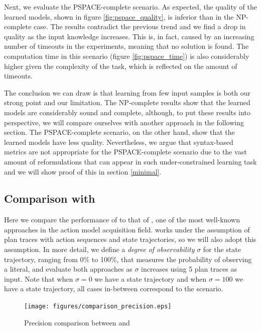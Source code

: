Next, we evaluate the PSPACE-complete scenario. As expected, the quality of the learned models, shown in figure \ref{fig:pspace_quality}, is inferior than in the NP-complete case. The results contradict the previous trend and we find a drop in quality as the input knowledge increases. This is, in fact, caused by an increasing number of timeouts in the experiments, meaning that no solution is found. The computation time in this scenario (figure \ref{fig:pspace_time}) is also considerably higher given the complexity of the task, which is reflected on the amount of timeouts.

The conclusion we can draw is that learning from few input samples is both our strong point and our limitation. The NP-complete results show that the learned models are considerably sound and complete, although, to put these results into perspective, we will compare ourselves with another approach in the following section. The PSPACE-complete scenario, on the other hand, show that the learned models have less quality. Nevertheless, we argue that syntax-based metrics are not appropriate for the PSPACE-complete scenario due to the vast amount of reformulations that can appear in such under-constrained learning task and we will show proof of this in section \ref{minimal}.


\subsection{Comparison with \ARMS}
Here we compare the performance of \FAMA to that of \ARMS, one of the most well-known approaches in the action model acquisition field. \ARMS works under the assumption of plan traces with \FO action sequences and \NO state trajectories, so we will also adopt this assumption. In more detail, we define a \emph{degree of observability} $\sigma$ for the state trajectory, ranging from 0\% to 100\%, that measures the probability of observing a literal, and evaluate both approaches as $\sigma$ increases using 5 plan traces as input. Note that when $\sigma = 0$ we have a \NO state trajectory and when $\sigma=100$ we have a \FO state trajectory, all cases in-between correspond to the \PO scenario.

\begin{figure}[hbt!]
	\centering
	\texttt{[image: figures/comparison\_precision.eps]}
	\caption{Precision comparison between \FAMA and \ARMS}
	\label{fig:comparison_precision}
\end{figure}


